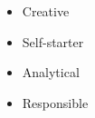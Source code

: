 %
%
%

\twocolumnsection
{
\begin{skills}
\end{skills}}
{
\vspace{1em}
\begin{itemize}
	\item Creative
	\item Self-starter
	\item Analytical
	\item Responsible
\end{itemize}
}
